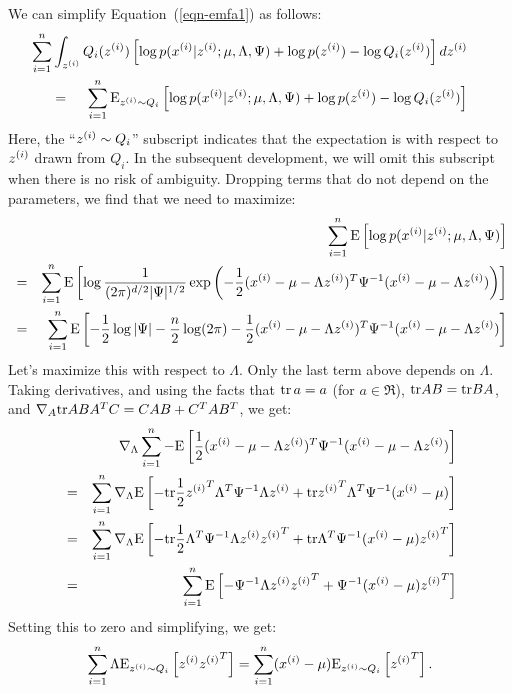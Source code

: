 \documentclass{article}
\begin{document}
We can simplify Equation~(\ref{eqn-emfa1}) as follows:
\begin{eqnarray}
&& \hbox to -0.5in{} \sum_{i=1}^\nexp \int_\zsi Q_i(\zsi) \left[ \log p(\xsi | \zsi ; \mu, \Lambda, \Psi) + \log p(\zsi)  - \log Q_i(\zsi) \right] d\zsi  \\
&=& \sum_{i=1}^\nexp \E_{\zsi \sim Q_i} \left[
\log p(\xsi| \zsi ; \mu, \Lambda, \Psi) + \log p(\zsi)
- \log Q_i(\zsi) \right]
\end{eqnarray}
Here, the ``$\zsi \sim Q_i$'' subscript indicates that the expectation is with respect to
$\zsi$ drawn from $Q_i$.  In the subsequent development,
we will omit this subscript when there is no risk of ambiguity.
Dropping terms that do not depend on the
parameters, we find that we need to maximize:
\begin{eqnarray*}
&&\hbox to -0.4in{} \sum_{i=1}^\nexp \E\left[ \log p(\xsi| \zsi ; \mu, \Lambda, \Psi)\right] \\
&=& \sum_{i=1}^\nexp \E\left[ \log \frac{1}{(2\pi)^{\di/2}|\Psi|^{1/2}} \exp\left(-\frac{1}{2}
(\xsi-\mu-\Lambda \zsi)^T\Psi^{-1} (\xsi-\mu-\Lambda \zsi)\right)\right] \\
&=& \sum_{i=1}^\nexp \E\left[ -\frac{1}{2} \log|\Psi| - \frac{n}{2}\log (2\pi) - \frac{1}{2}
(\xsi-\mu-\Lambda \zsi)^T\Psi^{-1} (\xsi-\mu-\Lambda \zsi)\right]
\end{eqnarray*}
Let's maximize this with respect to $\Lambda$. Only the last term above depends on $\Lambda$.
Taking derivatives, and using the facts that $\tr\, a = a$ (for $a \in \Re$), $\tr AB = \tr BA$,
and $\nabla_A \tr ABA^TC = CAB+C^TAB^T$, we get:
\begin{eqnarray*}
&& \hbox to -0.4in{} \nabla_\Lambda \sum_{i=1}^\nexp - \E\left[\frac{1}{2} (\xsi-\mu-\Lambda \zsi)^T\Psi^{-1} (\xsi-\mu-\Lambda \zsi) \right]\\
&=& \sum_{i=1}^\nexp \nabla_\Lambda \E\left[ - \tr \frac{1}{2}\zsi^T \Lambda^T \Psi^{-1} \Lambda \zsi + \tr \zsi^T\Lambda^T \Psi^{-1} (\xsi-\mu) \right]\\
&=& \sum_{i=1}^\nexp \nabla_\Lambda \E\left[  - \tr \frac{1}{2}\Lambda^T \Psi^{-1} \Lambda \zsi \zsi^T + \tr \Lambda^T \Psi^{-1} (\xsi-\mu) \zsi^T \right]\\
&=& \sum_{i=1}^\nexp \E\left[ - \Psi^{-1} \Lambda \zsi \zsi^T + \Psi^{-1} (\xsi-\mu) \zsi^T \right]
\end{eqnarray*}
Setting this to zero and simplifying, we get:
\[
\sum_{i=1}^\nexp \Lambda \E_{\zsi \sim Q_i}\left[ \zsi \zsi^T\right] =
\sum_{i=1}^\nexp (\xsi-\mu) \E_{\zsi \sim Q_i}\left[\zsi^T \right].
\]
\end{document}
